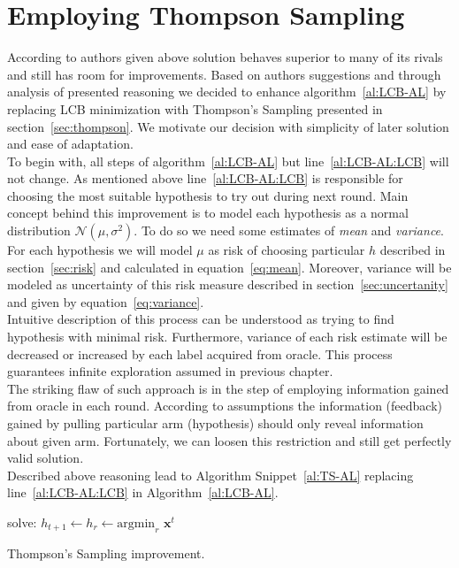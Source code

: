 \documentclass[12pt, a4paper, pdflatex, leqno]{report}
\begin{document}
\section{Employing Thompson Sampling\label{sec:thompsonimprovement}}
According to authors given above solution behaves superior to many of its rivals and still has room for improvements. Based on authors suggestions and through analysis of presented reasoning we decided to enhance algorithm~\ref{al:LCB-AL} by replacing LCB minimization with Thompson's Sampling presented in section~\ref{sec:thompson}. We motivate our decision with simplicity of later solution and ease of adaptation.\\

To begin with, all steps of algorithm~\ref{al:LCB-AL} but line~\ref{al:LCB-AL:LCB} will not change. As mentioned above line~\ref{al:LCB-AL:LCB} is responsible for choosing the most suitable hypothesis to try out during next round. Main concept behind this improvement is to model each hypothesis as a normal distribution $\mathcal{N}\left( \mu, \sigma^2 \right)$. To do so we need some estimates of \emph{mean} and \emph{variance}. For each hypothesis we will model $\mu$ as risk of choosing particular $h$ described in section~\ref{sec:risk} and calculated in equation~\ref{eq:mean}. Moreover, variance will be modeled as uncertainty of this risk measure described in section~\ref{sec:uncertanity} and given by equation~\ref{eq:variance}.\\

Intuitive description of this process can be understood as trying to find hypothesis with minimal risk. Furthermore, variance of each risk estimate will be decreased or increased by each label acquired from oracle. This process guarantees infinite exploration assumed in previous chapter.\\
The striking flaw of such approach is in the step of employing information gained from oracle in each round. According to assumptions the information (feedback) gained by pulling particular arm (hypothesis) should only reveal information about given arm. Fortunately, we can loosen this restriction and still get perfectly valid solution.\\

Described above reasoning lead to Algorithm Snippet~\ref{al:TS-AL} replacing line~\ref{al:LCB-AL:LCB} in Algorithm~\ref{al:LCB-AL}.


\vspace{2cm}
\begin{algorithm}[H]
  solve: $h_{t+1} \leftarrow h_r \leftarrow \text{argmin}_{r} \text{~} \mathbf{x}^t$\;
 \caption{Thompson's Sampling improvement.\label{al:TS-AL}}
\end{algorithm}
\vspace{2cm}
\end{document}
